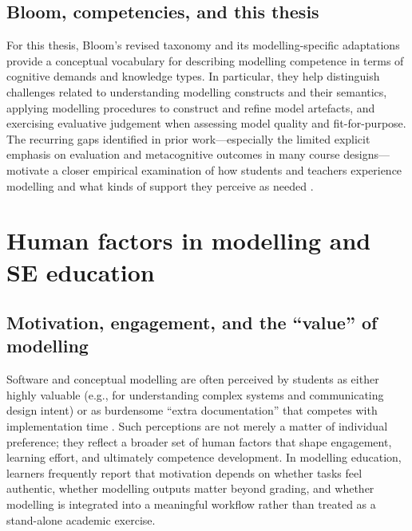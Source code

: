\subsection{Bloom, competencies, and this thesis}
\label{subsec:bloom_competencies_thesis}

For this thesis, Bloom's revised taxonomy and its modelling-specific adaptations provide a conceptual vocabulary for describing modelling competence in terms of cognitive demands and knowledge types. In particular, they help distinguish challenges related to understanding modelling constructs and their semantics, applying modelling procedures to construct and refine model artefacts, and exercising evaluative judgement when assessing model quality and fit-for-purpose. The recurring gaps identified in prior work---especially the limited explicit emphasis on evaluation and metacognitive outcomes in many course designs---motivate a closer empirical examination of how students and teachers experience modelling and what kinds of support they perceive as needed \cite{bogdanova2019camelot,bogdanova2017domain,bork2019framework,sedelmaier2013research}.


\section{Human factors in modelling and SE education}
\label{sec:human_factors}


\subsection{Motivation, engagement, and the ``value'' of modelling}
\label{subsec:hf_motivation_value}

Software and conceptual modelling are often perceived by students as either highly valuable (e.g., for understanding complex systems and communicating design intent) or as burdensome ``extra documentation'' that competes with implementation time \cite{grassl2026dei}. Such perceptions are not merely a matter of individual preference; they reflect a broader set of human factors that shape engagement, learning effort, and ultimately competence development. In modelling education, learners frequently report that motivation depends on whether tasks feel authentic, whether modelling outputs matter beyond grading, and whether modelling is integrated into a meaningful workflow rather than treated as a stand-alone academic exercise. \cite{grassl2026dei,holmes2018dimensions}

